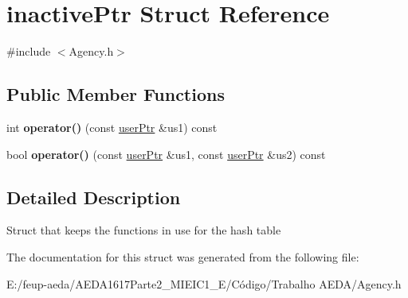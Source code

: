 \hypertarget{structinactive_ptr}{}\section{inactive\+Ptr Struct Reference}
\label{structinactive_ptr}


{\ttfamily \#include $<$Agency.\+h$>$}

\subsection*{Public Member Functions}
\begin{DoxyCompactItemize}
\item 
int {\bfseries operator()} (const \hyperlink{structuser_ptr}{user\+Ptr} \&us1) const
\item 
bool {\bfseries operator()} (const \hyperlink{structuser_ptr}{user\+Ptr} \&us1, const \hyperlink{structuser_ptr}{user\+Ptr} \&us2) const
\end{DoxyCompactItemize}


\subsection{Detailed Description}
Struct that keeps the functions in use for the hash table 

The documentation for this struct was generated from the following file\+:\begin{DoxyCompactItemize}
\item 
E\+:/feup-\/aeda/\+A\+E\+D\+A1617\+Parte2\+\_\+M\+I\+E\+I\+C1\+\_\+\+E/\+Código/\+Trabalho A\+E\+D\+A/Agency.\+h\end{DoxyCompactItemize}
